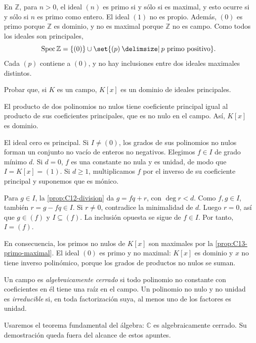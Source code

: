 En $\mathbb Z$, para $n>0$, el ideal $(n)$ es primo si y sólo si es maximal, y esto ocurre si y sólo si $n$ es primo como entero. El ideal $(1)$ no es propio. Además, $(0)$ es primo porque $\mathbb Z$ es dominio, y no es maximal porque $\mathbb Z$ no es campo. Como todos los ideales son principales,
\[
\Spec\mathbb Z=\{(0)\}\cup\set{(p)\given p\text{ primo positivo}}.
\]
Cada $(p)$ contiene a $(0)$, y no hay inclusiones entre dos ideales maximales distintos.

\begin{ejer}\label{ejer:C13-Kx}
Probar que, si $K$ es un campo, $K[x]$ es un dominio de ideales principales.
\end{ejer}
\begin{sol}
El producto de dos polinomios no nulos tiene coeficiente principal igual al producto de sus coeficientes principales, que es no nulo en el campo. Así, $K[x]$ es dominio.

El ideal cero es principal. Si $I\ne(0)$, los grados de sus polinomios no nulos forman un conjunto no vacío de enteros no negativos. Elegimos $f\in I$ de grado mínimo $d$. Si $d=0$, $f$ es una constante no nula y es unidad, de modo que $I=K[x]=(1)$. Si $d\geq1$, multiplicamos $f$ por el inverso de su coeficiente principal y suponemos que es mónico.

Para $g\in I$, la \cref{prop:C12-division} da $g=fq+r$, con $\deg r<d$. Como $f,g\in I$, también $r=g-fq\in I$. Si $r\ne0$, contradice la minimalidad de $d$. Luego $r=0$, así que $g\in(f)$ y $I\subseteq(f)$. La inclusión opuesta se sigue de $f\in I$. Por tanto, $I=(f)$.
\end{sol}

En consecuencia, los primos no nulos de $K[x]$ son maximales por la \cref{prop:C13-primo-maximal}. El ideal $(0)$ es primo y no maximal: $K[x]$ es dominio y $x$ no tiene inverso polinómico, porque los grados de productos no nulos se suman.

\begin{defi}
Un campo es \emph{algebraicamente cerrado} si todo polinomio no constante con coeficientes en él tiene una raíz en el campo. Un polinomio no nulo y no unidad es \emph{irreducible} si, en toda factorización suya, al menos uno de los factores es unidad.
\end{defi}
Usaremos el teorema fundamental del álgebra: $\mathbb C$ es algebraicamente cerrado. Su demostración queda fuera del alcance de estos apuntes.

